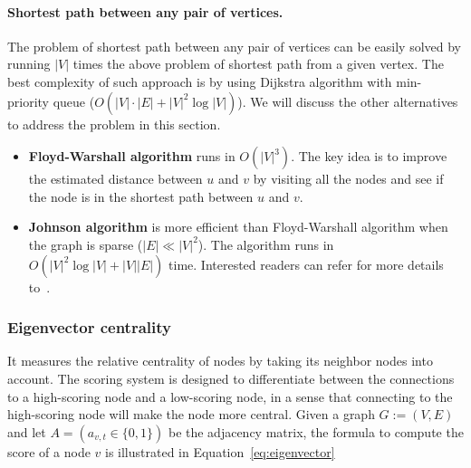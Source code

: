 \paragraph{Shortest path between any pair of vertices.}
The problem of shortest path between any pair of vertices can be easily solved
by running $|V|$ times the above problem of shortest path from a given vertex.
The best complexity of such approach is by using Dijkstra algorithm with min-
priority queue ($O(|V|\cdot|E|+|V|^2\log|V|)$). We will discuss the other
alternatives to address the problem in this section.
	\begin{itemize}	
	\squish
		\item {\bf Floyd-Warshall algorithm} runs in $O(|V|^3)$. The key idea is
		to improve the estimated distance between $u$ and $v$ by visiting all
		the nodes and see if the node is in the shortest path between $u$ and
		$v$.

	 	\item {\bf Johnson algorithm} is more efficient than Floyd-Warshall
	 	algorithm when the graph is sparse ($|E| \ll |V|^2$). The algorithm
	 	runs in $O(|V|^2\log|V| + |V||E|)$ time. Interested readers can refer for
	 	more details to~\cite{johnson-alg}.
	\end{itemize}


\subsubsection{Eigenvector centrality}
%
It measures the relative centrality of nodes by taking its neighbor nodes into
account. The scoring system is designed to differentiate between the
connections to a high-scoring node and a low-scoring node, in a sense that
connecting to the high-scoring node will make the node more central. Given a
graph $G:=(V,E)$ and let $A = (a_{v,t}\in\{0, 1\})$ be the adjacency matrix,
the formula to compute the score of a node $v$ is illustrated in
Equation~\eqref{eq:eigenvector}

